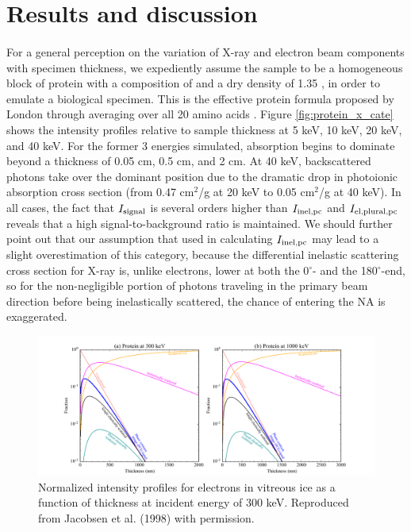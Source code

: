 \documentclass[review]{elsarticle}
\newcommand\signal{\textup{\scriptsize{signal}}}
\newcommand\inelpc{\textup{\scriptsize{inel,pc}}}
\newcommand\elplpc{\textup{\scriptsize{el,plural,pc}}}
\begin{document}
\section{Results and discussion}

\paragraph{} For a general perception on the variation of X-ray and electron beam components with specimen thickness, we expediently assume the sample to be a homogeneous block of protein with a composition of  and a dry density of 1.35 , in order to emulate a biological specimen. This is the effective protein formula proposed by London through averaging over all 20 amino acids \cite{London:1989hh}. Figure \ref{fig:protein_x_cate} shows the intensity profiles relative to sample thickness at 5 keV, 10 keV, 20 keV, and 40 keV. For the former 3 energies simulated, absorption begins to dominate beyond a thickness of 0.05 cm, 0.5 cm, and 2 cm. At 40 keV, backscattered photons take over the dominant position due to the dramatic drop in photoionic absorption cross section (from 0.47 cm$^2$/g at 20 keV to 0.05 cm$^2$/g at 40 keV). In all cases, the fact that $I_\signal$ is several orders higher than $I_\inelpc$ and $I_\elplpc$ reveals that a high signal-to-background ratio is maintained. We should further point out that our assumption that used in calculating $I_\inelpc$ may lead to a slight overestimation of this category, because the differential inelastic scattering cross section for X-ray is, unlike electrons, lower at both the 0$^\circ$- and the 180$^\circ$-end, so for the non-negligible portion of photons traveling in the primary beam direction before being inelastically scattered, the chance of entering the NA is exaggerated.  

\begin{figure}[t!]
\begin{center}
\includegraphics[scale=0.6]{unimatrix_fig_e_protein.pdf}
\caption{Normalized intensity profiles for electrons in vitreous ice as a function of thickness at incident energy of 300 keV. Reproduced from Jacobsen et al. (1998) with permission.}
\label{fig:ice_e_cate}
\end{center}
\end{figure}
\end{document}
